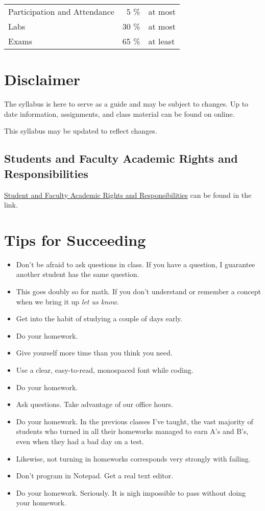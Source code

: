 \documentclass[10pt, letter]{article}
\begin{document}
\begin{tabular}{ l  r l}
	Participation and Attendance & 5 \% & at most \\
	Labs & 30 \% & at most \\
	Exams & 65 \% & at least \\
\end{tabular}


\section*{Disclaimer}
The syllabus is here to serve as a guide and may be subject to changes.  Up to date information, assignments, and class material can be found on online.

This syllabus may be updated to reflect changes.


\subsection*{Students and Faculty Academic Rights and Responsibilities}
\href{http://policies.temple.edu/PDF/99.pdf}{Student and Faculty Academic Rights and Responsibilities} can be found in the link.


\section*{Tips for Succeeding}
\begin{itemize}
	\item Don't be afraid to ask questions in class.  If you have a question, I guarantee another student has the same question.  
	\item This goes doubly so for math.  If you don't understand or remember a concept when we bring it up \emph{let us know.}
	\item Get into the habit of studying a couple of days early.
	\item Do your homework.
	\item Give yourself more time than you think you need.
	\item Use a clear, easy-to-read, monospaced font while coding.
	\item Do your homework.
	\item Ask questions.  Take advantage of our office hours.
	\item Do your homework.  In the previous classes I've taught, the vast majority of students who turned in all their homeworks managed to earn A's and B's, even when they had a bad day on a test.
	\item Likewise, not turning in homeworks corresponds very strongly with failing.
	\item Don't program in Notepad.  Get a real text editor.
	\item Do your homework. Seriously.  It is nigh impossible to pass without doing your homework.
	
	
\end{itemize}
\end{document}
